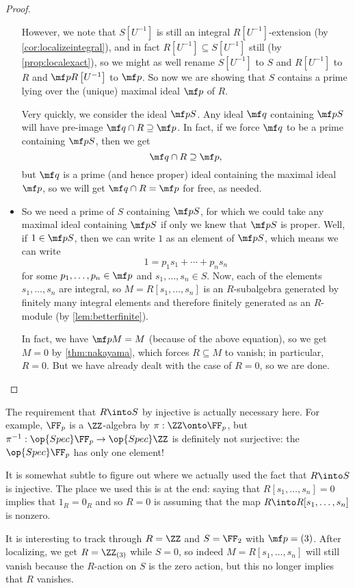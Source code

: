 \begin{proof}
\begin{itemize}
		However, we note that $S\left[U^{-1}\right]$ is still an integral $R\left[U^{-1}\right]$-extension (by \autoref{cor:localizeintegral}), and in fact $R\left[U^{-1}\right]\subseteq S\left[U^{-1}\right]$ still (by \autoref{prop:localexact}), so we might as well rename $S\left[U^{-1}\right]$ to $S$ and $R\left[U^{-1}\right]$ to $R$ and $\mf pR\left[U^{-1}\right]$ to $\mf p$. So now we are showing that $S$ contains a prime lying over the (unique) maximal ideal $\mf p$ of $R$.
		
		Very quickly, we consider the ideal $\mf pS$. Any ideal $\mf q$ containing $\mf pS$ will have pre-image $\mf q\cap R\supseteq\mf p$. In fact, if we force $\mf q$ to be a prime containing $\mf pS$, then we get
		\[\mf q\cap R\supseteq\mf p,\]
		but $\mf q$ is a prime (and hence proper) ideal containing the maximal ideal $\mf p$, so we will get $\mf q\cap R=\mf p$ for free, as needed.
		
		\item So we need a prime of $S$ containing $\mf pS$, for which we could take any maximal ideal containing $\mf pS$ if only we knew that $\mf pS$ is proper. Well, if $1\in\mf pS$, then we can write $1$ as an element of $\mf pS$, which means we can write
		\[1=p_1s_1+\cdots+p_ns_n\]
		for some $p_1,\ldots,p_n\in\mf p$ and $s_1,\ldots,s_n\in S$. Now, each of the elements $s_1,\ldots,s_n$ are integral, so $M=R[s_1,\ldots,s_n]$ is an $R$-subalgebra generated by finitely many integral elements and therefore finitely generated as an $R$-module (by \autoref{lem:betterfinite}).
		
		In fact, we have $\mf pM=M$ (because of the above equation), so we get $M=0$ by \autoref{thm:nakayama}, which forces $R\subseteq M$ to vanish; in particular, $R=0$. But we have already dealt with the case of $R=0$, so we are done.
		\qedhere
	\end{itemize}
\end{proof}
\begin{remark}[Nir]
	The requirement that $R\into S$ by injective is actually necessary here. For example, $\FF_p$ is a $\ZZ$-algebra by $\pi:\ZZ\onto\FF_p$, but $\pi^{-1}:\op{Spec}\FF_p\to\op{Spec}\ZZ$ is definitely not surjective: the $\op{Spec}\FF_p$ has only one element!
\end{remark}
\begin{remark}[Nir]
	It is somewhat subtle to figure out where we actually used the fact that $R\into S$ is injective. The place we used this is at the end: saying that $R[s_1,\ldots,s_n]=0$ implies that $1_R=0_R$ and so $R=0$ is assuming that the map $R\into R[s_1,\ldots,s_n]$ is nonzero.
	
	It is interesting to track through $R=\ZZ$ and $S=\FF_2$ with $\mf p=(3)$. After localizing, we get $R=\ZZ_{(3)}$ while $S=0$, so indeed $M=R[s_1,\ldots,s_n]$ will still vanish because the $R$-action on $S$ is the zero action, but this no longer implies that $R$ vanishes.
\end{remark}
